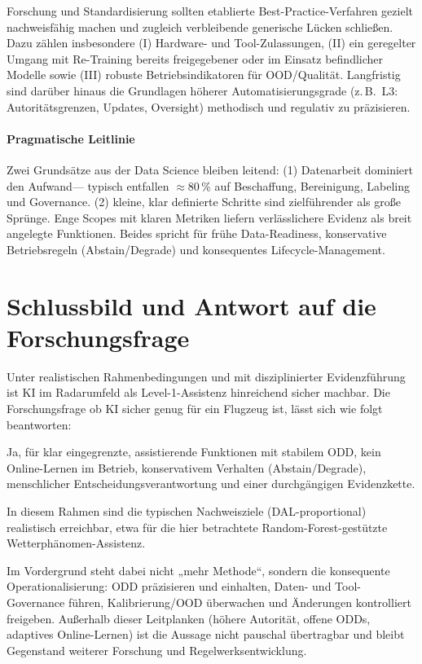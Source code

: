 Forschung und Standardisierung sollten etablierte Best-Practice-Verfahren gezielt
nachweisfähig machen und zugleich verbleibende generische Lücken schließen. Dazu zählen
insbesondere (I) Hardware- und Tool-Zulassungen, (II) ein geregelter Umgang mit 
Re-Training bereits freigegebener oder im Einsatz befindlicher Modelle sowie (III) robuste
Betriebsindikatoren für OOD/Qualität. Langfristig sind darüber hinaus die
Grundlagen höherer Automatisierungsgrade (z.\,B.\ L3: Autoritätsgrenzen, Updates, Oversight)
methodisch und regulativ zu präzisieren. 

\paragraph{Pragmatische Leitlinie}
Zwei Grundsätze aus der Data Science bleiben leitend: (1) Datenarbeit dominiert den Aufwand— typisch entfallen 
\(\approx 80\,\%\) auf Beschaffung, Bereinigung, Labeling und Governance. (2) kleine, klar definierte Schritte 
sind zielführender als große Sprünge. Enge Scopes mit klaren Metriken liefern verlässlichere Evidenz als breit angelegte Funktionen. 
Beides spricht für frühe Data-Readiness, konservative Betriebsregeln (Abstain/Degrade) und konsequentes 
Lifecycle-Management.

\section{Schlussbild und Antwort auf die Forschungsfrage}
Unter realistischen Rahmenbedingungen und mit disziplinierter Evidenzführung ist KI im Radarumfeld als
Level-1-Assistenz hinreichend sicher machbar. 
Die Forschungsfrage ob KI sicher genug für ein Flugzeug ist, lässt sich wie folgt beantworten:

Ja, für klar eingegrenzte, assistierende Funktionen mit
stabilem ODD, kein Online-Lernen im Betrieb, konservativem Verhalten (Abstain/Degrade),
menschlicher Entscheidungsverantwortung und einer durchgängigen Evidenzkette. 

In diesem Rahmen sind die typischen Nachweisziele (DAL-proportional) realistisch erreichbar, etwa für die hier
betrachtete Random-Forest-gestützte Wetterphänomen-Assistenz.

Im Vordergrund steht dabei nicht „mehr Methode“, sondern die konsequente Operationalisierung:
ODD präzisieren und einhalten, Daten- und Tool-Governance führen, Kalibrierung/OOD überwachen und Änderungen
kontrolliert freigeben. Außerhalb dieser Leitplanken (höhere Autorität, offene ODDs, adaptives Online-Lernen)
ist die Aussage nicht pauschal übertragbar und bleibt Gegenstand weiterer Forschung und Regelwerksentwicklung.
